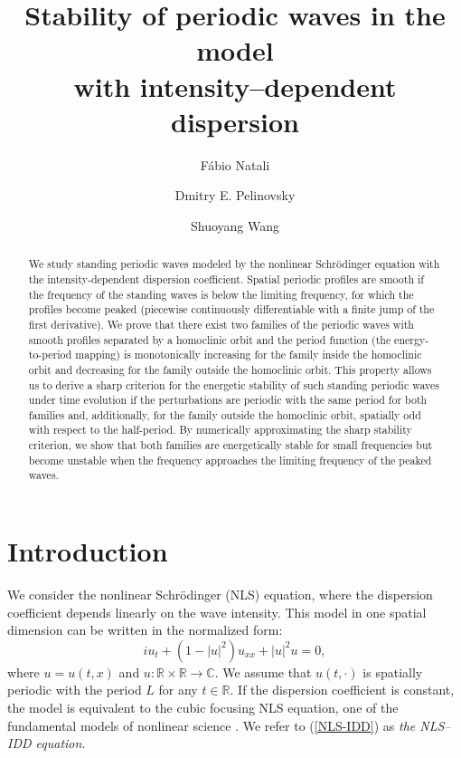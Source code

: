 \documentclass[12pt,reqno]{amsart}
\title[Stability of periodic waves in the NLS-IDD model]{Stability of periodic waves in the model \\ with intensity--dependent dispersion}
\author[F. Natali]{F\'abio Natali}
\author[D. E. Pelinovsky]{Dmitry E. Pelinovsky}
\author[S. Wang]{Shuoyang Wang}
\numberwithin{equation}{section}
\numberwithin{figure}{section}
\begin{document}
	
	\maketitle
	
			

\begin{abstract} 
	We study standing periodic waves modeled by the nonlinear Schr\"{o}dinger equation with the intensity-dependent dispersion coefficient. 
	Spatial periodic profiles are smooth if the frequency of the standing waves 
	is below the limiting frequency, for which the profiles become peaked (piecewise continuously differentiable with a finite jump of the first derivative). We prove that there exist two families of the periodic waves with smooth profiles separated by a homoclinic orbit and the period function (the energy-to-period mapping) is monotonically increasing for the family inside the homoclinic orbit and decreasing for the family outside the homoclinic orbit. This property allows us to derive a sharp criterion for the energetic stability of such standing periodic waves under time evolution if the perturbations are periodic with the same period for both families and, additionally, for the family outside the homoclinic orbit, spatially odd with respect to the half-period. By numerically approximating the sharp stability criterion, we show that both families are energetically stable for small frequencies but become unstable when the frequency approaches the limiting frequency of the peaked waves. 
\end{abstract}


\section{Introduction}

We consider the nonlinear Schr\"odinger (NLS) equation, where the dispersion coefficient depends linearly on the wave intensity. This model in one spatial dimension 
can be written in the normalized form:
\begin{equation}
	iu_t+(1-|u|^2)u_{xx}+|u|^2u=0, 
	\label{NLS-IDD}
	\end{equation}
where $u = u(t,x)$ and $u:\mathbb{R}\times \mathbb{R}\rightarrow \mathbb{C}$. 
We assume that $u(t,\cdot)$ is spatially periodic with the period $L$ for any $t \in \mathbb{R}$. If the dispersion coefficient is constant, the model is equivalent to the cubic 
focusing NLS equation, one of the fundamental models of nonlinear science \cite{Fibich,Kev-Dark-2015}. We refer to (\ref{NLS-IDD}) as {\em the NLS--IDD equation}. 
\end{document}
